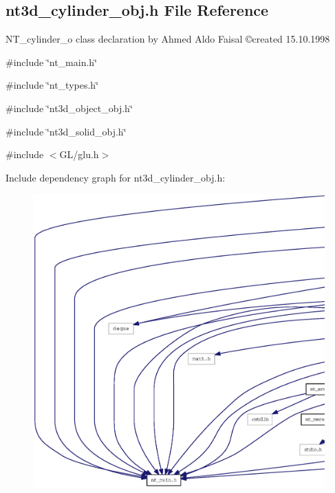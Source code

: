 \subsection{nt3d\_\-cylinder\_\-obj.h File Reference}
\label{nt3d__cylinder__obj_8h}



\begin{DoxyItemize}
\item NT\_\-cylinder\_\-o class declaration by Ahmed Aldo Faisal \copyright created 15.10.1998 
\end{DoxyItemize} 


{\ttfamily \#include \char`\"{}nt\_\-main.h\char`\"{}}\par
{\ttfamily \#include \char`\"{}nt\_\-types.h\char`\"{}}\par
{\ttfamily \#include \char`\"{}nt3d\_\-object\_\-obj.h\char`\"{}}\par
{\ttfamily \#include \char`\"{}nt3d\_\-solid\_\-obj.h\char`\"{}}\par
{\ttfamily \#include $<$GL/glu.h$>$}\par
Include dependency graph for nt3d\_\-cylinder\_\-obj.h:
\nopagebreak
\begin{figure}[H]
\begin{center}
\leavevmode
\includegraphics[width=400pt]{nt3d__cylinder__obj_8h__incl}
\end{center}
\end{figure}
